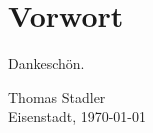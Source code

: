 \newpage
{}
\clearscrheadfoot
\rofoot{\pagemark}
\chapter*{Vorwort}



\noindent Dankeschön.


 \vspace{2cm}

\begin{flushleft}
	Thomas Stadler
	\\Eisenstadt, \today
\end{flushleft}
